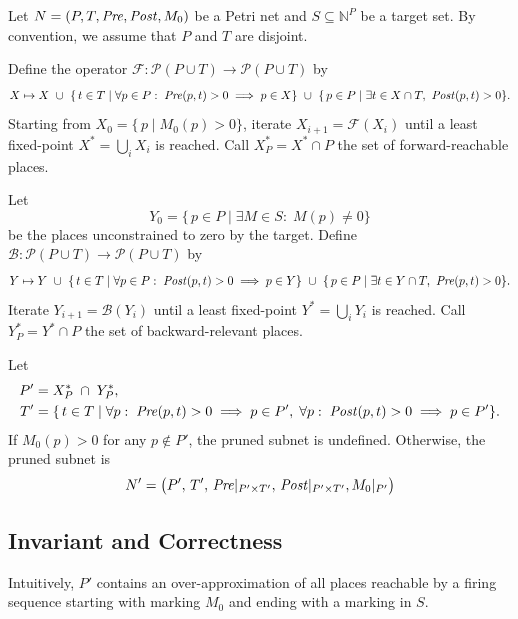 Let $N=(P,T,\mathit{Pre},\mathit{Post}, M_0)$ be a Petri net and $S\subseteq\mathbb{N}^P$ be a target set.
%
By convention, we assume that $P$ and $T$ are disjoint.
 
\begin{definition}
	Define the operator $\mathcal{F}:\mathcal{P}(P\cup T)\to\mathcal{P}(P\cup T)$ by
	\[
	X \mapsto X
	~\cup~
	\{\,t\in T \mid \forall p\in P:\; \mathit{Pre}(p,t)>0 \implies p\in X\}
	~\cup~
	\{\,p\in P \mid \exists t\in X\cap T,\ \mathit{Post}(p,t)>0\}.
	\]
	Starting from $X_0 = \{\,p\mid M_0(p)>0\}$, iterate
	$X_{i+1} = \mathcal{F}(X_i)$ until a least fixed-point
	$X^*=\bigcup_i X_i$ is reached.  Call $X^*_P = X^*\cap P$ the set of
	forward-reachable places.
\end{definition}

\begin{definition}
	Let
	\[
	Y_0 = \{\,p\in P \mid \exists M\in S:\;M(p)\neq0\}
	\]
	be the places unconstrained to zero by the target.  Define
	$\mathcal{B}:\mathcal{P}(P\cup T)\to\mathcal{P}(P\cup T)$ by
	\[
	Y \mapsto Y
	~\cup~
	\{\,t\in T \mid \forall p\in P:\; \mathit{Post}(p,t)>0 \implies p\in Y\}
	~\cup~
	\{\,p\in P \mid \exists t\in Y\cap T,\ \mathit{Pre}(p,t)>0\}.
	\]
	Iterate $Y_{i+1} = \mathcal{B}(Y_i)$ until a least fixed-point
	$Y^*=\bigcup_i Y_i$ is reached.  Call $Y^*_P = Y^*\cap P$ the set of
	backward-relevant places.
\end{definition}

\begin{definition}
  Let
  \begin{align*}
    P' &= X^*_P \;\cap\; Y^*_P,
    \\
    T' &= \{\,t\in T \mid
    \forall p:\;\mathit{Pre}(p,t)>0\implies p\in P',\;
    \forall p:\;\mathit{Post}(p,t)>0\implies p\in P'
    \}.
  \end{align*}
  If $M_0(p) > 0$ for any $p \not\in P'$, the pruned subnet is undefined.
  Otherwise, the pruned subnet is
  \[
  N' = \bigl(P',\,T',\,\mathit{Pre}|_{P'\times T'},\,\mathit{Post}|_{P'\times T'}, M_0|_{P'}\bigr)
  \]
\end{definition}

\subsection{Invariant and Correctness}

Intuitively, $P'$ contains an over-approximation of all places reachable by a firing sequence starting with marking $M_0$ and ending with a marking in $S$.

